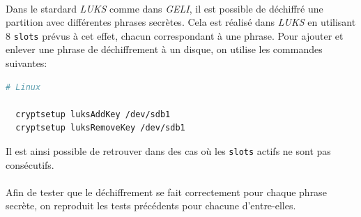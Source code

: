 \paragraph{}
Dans le stardard \textit{LUKS} comme dans \textit{GELI}, il est possible de
déchiffré une partition avec différentes phrases secrètes. Cela est réalisé dans
\textit{LUKS} en utilisant 8 \texttt{slots} prévus à cet effet, chacun
correspondant à une phrase.
Pour ajouter et enlever une phrase de déchiffrement à un disque, on utilise les
commandes suivantes:
\\
\begin{lstlisting}[language=bash]
  # Linux

  cryptsetup luksAddKey /dev/sdb1
  cryptsetup luksRemoveKey /dev/sdb1
\end{lstlisting}
Il est ainsi possible de retrouver dans des cas où les \texttt{slots} actifs ne
sont pas consécutifs.
\paragraph{}
Afin de tester que le déchiffrement se fait correctement pour chaque phrase
secrète, on reproduit les tests précédents pour chacune d'entre-elles.